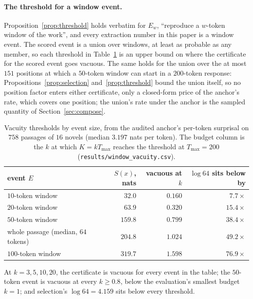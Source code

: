 \paragraph{The threshold for a window event.}\label{app:windowvacuity}
Proposition~\ref{prop:threshold} holds verbatim for $E_w$, ``reproduce a $w$-token window of the work'',
and every extraction number in this paper is a window event. The scored event is a union over windows, at
least as probable as any member, so each threshold in Table~\ref{tab:windowvacuity} is an upper bound on
where the certificate for the scored event goes vacuous. The same holds for the union over the at most
$151$ positions at which a $50$-token window can start in a $200$-token response: Propositions~\ref{prop:selection}
and~\ref{prop:threshold} bound the union itself, so no position factor enters either certificate, only a
closed-form price of the anchor's rate, which covers one position; the union's rate under the anchor is
the sampled quantity of Section~\ref{sec:compose}.

\begin{table}[ht]
\centering\footnotesize
\caption{Vacuity thresholds by event size, from the audited anchor's per-token surprisal on $758$
passages of $16$ novels (median $3.197$ nats per token). The budget column is the $k$ at which
$K = kT_{\max}$ reaches the threshold at $T_{\max}=200$ (\texttt{results/\allowbreak window\_\allowbreak vacuity.csv}).}
\label{tab:windowvacuity}
\begin{tabular}{@{}lrrr@{}}
\toprule
event $E$ & $S(x)$, nats & vacuous at $k$ & $\log 64$ sits below by \\
\midrule
$10$-token window   & $32.0$  & $0.160$ & $7.7\times$ \\
$20$-token window   & $63.9$  & $0.320$ & $15.4\times$ \\
$50$-token window   & $159.8$ & $0.799$ & $38.4\times$ \\
whole passage (median, $64$ tokens) & $204.8$ & $1.024$ & $49.2\times$ \\
$100$-token window  & $319.7$ & $1.598$ & $76.9\times$ \\
\bottomrule
\end{tabular}
\end{table}

\noindent At $k = 3, 5, 10, 20$, the certificate is vacuous for every event in the table; the $50$-token
event is vacuous at every $k \ge 0.8$, below the evaluation's smallest budget $k=1$; and selection's
$\log 64 = 4.159$ sits below every threshold.

